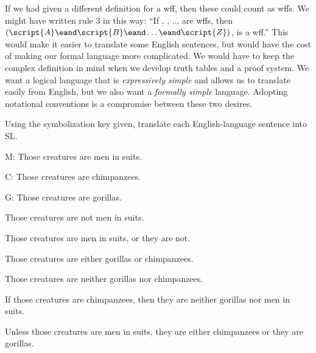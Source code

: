 If we had given a different definition for a wff, then these could count as wffs. We might have written rule 3 in this way: ``If , , $\ldots$  are wffs, then $(\script{A}\eand\script{B}\eand\ldots\eand\script{Z})$, is a wff.'' This would make it easier to translate some English sentences, but would have the cost of making our formal language more complicated. We would have to keep the complex definition in mind when we develop truth tables and a proof system. We want a logical language that is \emph{expressively simple} and allows us to translate easily from English, but we also want a \emph{formally simple} language. Adopting notational conventions is a compromise between these two desires.



\practiceproblems

\solutions
\problempart Using the symbolization key given, translate each English-language sentence into SL.
\label{pr.monkeysuits}
\begin{ekey}
\item[M:] Those creatures are men in suits. 
\item[C:] Those creatures are chimpanzees. 
\item[G:] Those creatures are gorillas.
\end{ekey}
\begin{earg}
\item Those creatures are not men in suits.
\item Those creatures are men in suits, or they are not.
\item Those creatures are either gorillas or chimpanzees.
\item Those creatures are neither gorillas nor chimpanzees.
\item If those creatures are chimpanzees, then they are neither gorillas nor men in suits.
\item Unless those creatures are men in suits, they are either chimpanzees or they are gorillas.
\end{earg}


